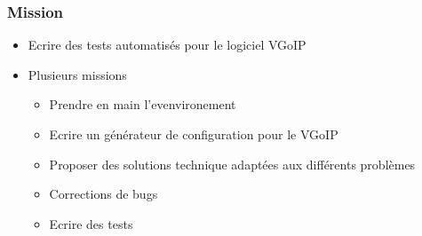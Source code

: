 \begin{frame}
    \frametitle{Mission}
    \begin{itemize}
        \item Ecrire des tests automatisés pour le logiciel VGoIP
        \item Plusieurs missions
            \begin{itemize}
                \item Prendre en main l'evenvironement
                \item Ecrire un générateur de configuration pour le VGoIP
                \item Proposer des solutions technique adaptées aux différents problèmes
                \item Corrections de bugs
                \item Ecrire des tests
            \end{itemize}
    \end{itemize}
\end{frame}